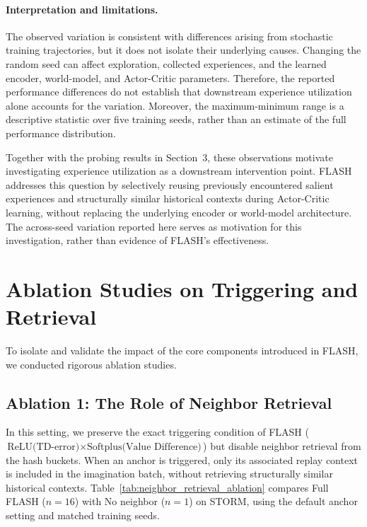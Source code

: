 \documentclass{article} %
\begin{document}
\paragraph{Interpretation and limitations.}
The observed variation is consistent with differences arising from stochastic training trajectories, but it does not isolate their underlying causes. Changing the random seed can affect exploration, collected experiences, and the learned encoder, world-model, and Actor-Critic parameters. Therefore, the reported performance differences do not establish that downstream experience utilization alone accounts for the variation. Moreover, the maximum-minimum range is a descriptive statistic over five training seeds, rather than an estimate of the full performance distribution.

Together with the probing results in Section~3, these observations motivate investigating experience utilization as a downstream intervention point. FLASH addresses this question by selectively reusing previously encountered salient experiences and structurally similar historical contexts during Actor-Critic learning, without replacing the underlying encoder or world-model architecture. The across-seed variation reported here serves as motivation for this investigation, rather than evidence of FLASH's effectiveness.

\FloatBarrier

\onecolumn
\section{Ablation Studies on Triggering and Retrieval}
\label{sec:appendix_ablation_studies}
To isolate and validate the impact of the core components introduced in FLASH, we conducted rigorous ablation studies.

\subsection{Ablation 1: The Role of Neighbor Retrieval}
In this setting, we preserve the exact triggering condition of FLASH ($\text{ReLU(TD-error)} \times \text{Softplus(Value Difference)}$) but disable neighbor retrieval from the hash buckets. When an anchor is triggered, only its associated replay context is included in the imagination batch, without retrieving structurally similar historical contexts. Table~\ref{tab:neighbor_retrieval_ablation} compares Full FLASH ($n=16$) with No neighbor ($n=1$) on STORM, using the default anchor setting and matched training seeds.
\end{document}

